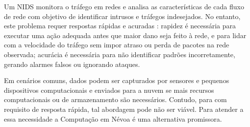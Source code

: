 Um \acf{NIDS} monitora o tráfego em redes e analisa as características de cada
fluxo de rede com objetivo de identificar intrusos e tráfegos indesejados.
No entanto, este problema requer respostas rápidas e acuradas \cite{DaCosta2019a}:
rapidez é necessária para executar uma ação adequada antes que
maior dano seja feito à rede, e para lidar com a velocidade do tráfego sem impor
atraso ou perda de pacotes na rede observada;
acurácia é necessária para não identificar padrões incorretamente, gerando
alarmes falsos ou ignorando ataques.


Em cenários \iot comuns, dados podem ser capturados por sensores e pequenos dispositivos
computacionais e enviados para a nuvem se mais recursos
computacionais ou de armazenamento são necessários. Contudo, para \nids com 
requisito de resposta rápida, tal abordagem pode não ser viável. 
Para atender a essa necessidade a Computação em Névoa é uma alternativa promissora.

